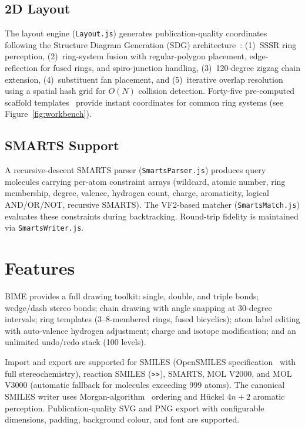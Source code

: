 \documentclass[twocolumn]{article}
\begin{document}
\subsection{2D Layout}

The layout engine (\texttt{Layout.js}) generates publication-quality
coordinates following the Structure Diagram Generation (SDG)
architecture~\citep{Helson1999}: (1)~SSSR ring perception,
(2)~ring-system fusion with regular-polygon placement, edge-reflection
for fused rings, and spiro-junction handling, (3)~120-degree zigzag
chain extension, (4)~substituent fan placement, and (5)~iterative
overlap resolution using a spatial hash grid for $O(N)$ collision
detection.  Forty-five pre-computed scaffold
templates~\citep{Bemis1996} provide instant coordinates for common ring
systems (see Figure~\ref{fig:workbench}).

\subsection{SMARTS Support}

A recursive-descent SMARTS parser (\texttt{SmartsParser.js}) produces
query molecules carrying per-atom constraint arrays (wildcard, atomic
number, ring membership, degree, valence, hydrogen count, charge,
aromaticity, logical AND/OR/NOT, recursive SMARTS).  The VF2-based
matcher (\texttt{SmartsMatch.js}) evaluates these constraints during
backtracking.  Round-trip fidelity is maintained via
\texttt{SmartsWriter.js}.

\section{Features}

BIME provides a full drawing toolkit: single, double, and triple bonds;
wedge/dash stereo bonds; chain drawing with angle snapping at 30-degree
intervals; ring templates (3--8-membered rings, fused bicyclics); atom
label editing with auto-valence hydrogen adjustment; charge and isotope
modification; and an unlimited undo/redo stack (100 levels).

Import and export are supported for SMILES (OpenSMILES
specification~\citep{OpenSMILES2024} with full stereochemistry),
reaction SMILES (\texttt{>>}), SMARTS, MOL V2000, and MOL V3000
(automatic fallback for molecules exceeding 999 atoms).  The canonical
SMILES writer uses Morgan-algorithm~\citep{Morgan1965} ordering and
H\"uckel $4n+2$ aromatic perception.  Publication-quality SVG and PNG
export with configurable dimensions, padding, background colour, and
font are supported.
\end{document}
